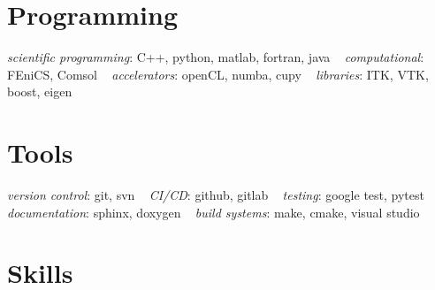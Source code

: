 \documentclass[english]{cv-style}
\begin{document}
\begin{aside}
\section{Programming}\vspace{0.5\baselineskip}
\emph{scientific programming}: C++, python, matlab, fortran, java
~
\emph{computational}: FEniCS, Comsol
~
\emph{accelerators}: openCL, numba, cupy
~
\emph{libraries}: ITK, VTK, boost, eigen
%
\section{Tools}\vspace{0.5\baselineskip}
\emph{version control}: git, svn
~
\emph{CI/CD}: github, gitlab
~
\emph{testing}: google test, pytest
~
\emph{documentation}: sphinx, doxygen
~
\emph{build systems}: make, cmake, visual studio
%
\end{aside}


\section{Skills}
  \vspace{-0.2cm}  

\end{document}
